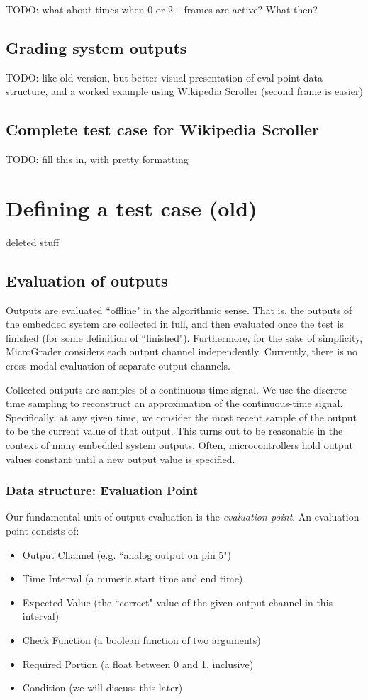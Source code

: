 \documentclass[12pt]{article}
\begin{document}
TODO: what about times when 0 or 2+ frames are active?  What then?

\subsection{Grading system outputs}
TODO: like old version, but better visual presentation of eval point data structure, and a worked example using Wikipedia Scroller (second frame is easier)

\subsection{Complete test case for Wikipedia Scroller}
TODO: fill this in, with pretty formatting


\newpage
\section{Defining a test case (old)}
deleted stuff

\subsection{Evaluation of outputs}
Outputs are evaluated ``offline" in the algorithmic sense.  That is, the outputs of the embedded system are collected in full, and then evaluated once the test is finished (for some definition of ``finished").  Furthermore, for the sake of simplicity, MicroGrader considers each output channel independently.  Currently, there is no cross-modal evaluation of separate output channels.

Collected outputs are samples of a continuous-time signal.  We use the discrete-time sampling to reconstruct an approximation of the continuous-time signal.  Specifically, at any given time, we consider the most recent sample of the output to be the current value of that output.  This turns out to be reasonable in the context of many embedded system outputs.  Often, microcontrollers hold output values constant until a new output value is specified.

\subsubsection{Data structure: Evaluation Point}
\label{sec:eval-point}
Our fundamental unit of output evaluation is the \textit{evaluation point}.  An evaluation point consists of:

\begin{itemize}
\item Output Channel (e.g. ``analog output on pin 5")
\item Time Interval (a numeric start time and end time)
\item Expected Value (the ``correct" value of the given output channel in this interval)
\item Check Function (a boolean function of two arguments)
\item Required Portion (a float between 0 and 1, inclusive)
\item Condition (we will discuss this later)
\end{itemize}
\end{document}
